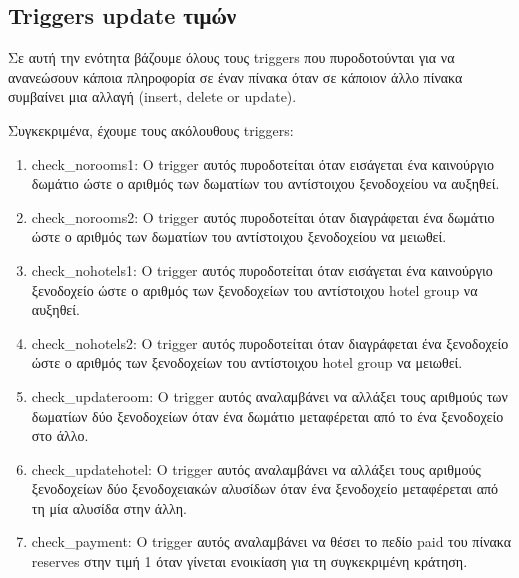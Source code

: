 \documentclass[a4paper,oneside, 11pt]{article}
\begin{document}
\subsection{Triggers update τιμών}
Σε αυτή την ενότητα βάζουμε όλους τους triggers που πυροδοτούνται για να ανανεώσουν κάποια πληροφορία σε έναν πίνακα όταν σε κάποιον άλλο πίνακα συμβαίνει μια αλλαγή (insert, delete or update). \bigbreak

Συγκεκριμένα, έχουμε τους ακόλουθους triggers:
\begin{enumerate}
\item check\_norooms1: Ο trigger αυτός πυροδοτείται όταν εισάγεται ένα καινούργιο δωμάτιο ώστε ο αριθμός των δωματίων του αντίστοιχου ξενοδοχείου να αυξηθεί.

\item check\_norooms2: Ο trigger αυτός πυροδοτείται όταν διαγράφεται ένα δωμάτιο ώστε ο αριθμός των δωματίων του αντίστοιχου ξενοδοχείου να μειωθεί.

\item check\_nohotels1: O trigger αυτός πυροδοτείται όταν εισάγεται ένα καινούργιο ξενοδοχείο ώστε ο αριθμός των ξενοδοχείων του αντίστοιχου hotel group να αυξηθεί.

\item check\_nohotels2: O trigger αυτός πυροδοτείται όταν διαγράφεται ένα ξενοδοχείο ώστε ο αριθμός των ξενοδοχείων του αντίστοιχου hotel group να μειωθεί.

\item check\_updateroom: Ο trigger αυτός αναλαμβάνει να αλλάξει τους αριθμούς των δωματίων δύο ξενοδοχείων όταν ένα δωμάτιο μεταφέρεται από το ένα ξενοδοχείο στο άλλο.

\item check\_updatehotel: Ο trigger αυτός αναλαμβάνει να αλλάξει τους αριθμούς ξενοδοχείων δύο ξενοδοχειακών αλυσίδων όταν ένα ξενοδοχείο μεταφέρεται από τη μία αλυσίδα στην άλλη.

\item check\_payment: Ο trigger αυτός αναλαμβάνει να θέσει το πεδίο paid του πίνακα reserves στην τιμή 1 όταν γίνεται ενοικίαση για τη συγκεκριμένη κράτηση.

\end{enumerate}
\end{document}
